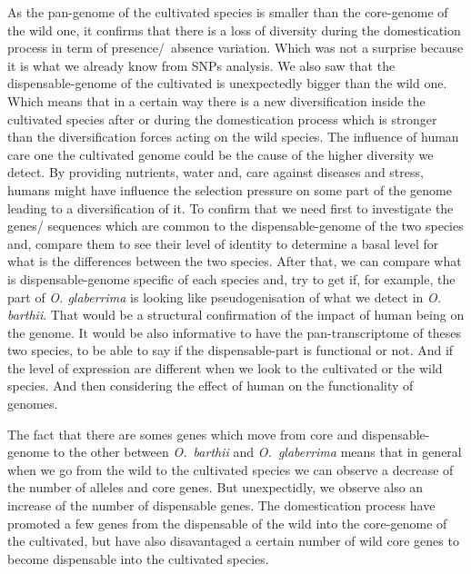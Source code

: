 \documentclass[10pt,letterpaper]{article}
\begin{document}
As the pan-genome of the cultivated species is smaller than the core-genome of the wild one, it confirms that there is a loss of diversity during the domestication process in term of presence/~absence variation. Which was not a surprise because it is what we already know from SNPs analysis. 
We also saw that the dispensable-genome of the cultivated is unexpectedly bigger than the wild one. Which means that in a certain way there is a new diversification inside the cultivated species after or during the domestication process which is stronger than the diversification forces acting on the wild species.
The influence of human care one the cultivated genome could be the cause of the higher diversity we detect. By providing nutrients, water and, care against diseases and stress, humans might have influence the selection pressure on some part of the genome leading to a diversification of it. To confirm that we need first to investigate the genes/ sequences which are common to the dispensable-genome of the two species and, compare them to see their level of identity to determine a basal level for what is the differences between the two species. After that, we can compare what is dispensable-genome specific of each species and, try to get if, for example, the part of \textit{O. glaberrima}  is looking like pseudogenisation of what we detect in \textit{O. barthii}. That would be a structural confirmation of the impact of human being on the genome.
It would be also informative to have the pan-transcriptome of theses two species, to be able to say if the dispensable-part is functional or not. And if the level of expression are different when we look to the cultivated or the wild species. And then considering the effect of human on the functionality of genomes. 

The fact that there are somes genes which move from core and dispensable-genome to the other between \emph{O.~barthii} and \emph{O.~glaberrima} means that in general when we go from the wild to the cultivated species we can observe a decrease 
of the number of  alleles and core genes. But unexpectidly, we observe also an increase of the number of dispensable genes. The domestication process have promoted a few genes from the dispensable of the wild into the core-genome of the cultivated, but have also disavantaged a certain number of wild core genes to become dispensable into the cultivated species.
% 
% 
% 
\end{document}
